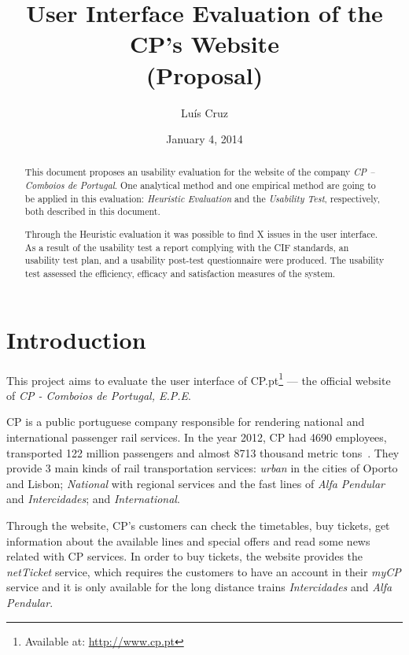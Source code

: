 \documentclass[a4paper]{article}
\title{User Interface Evaluation of the CP's Website\\ (Proposal)}
\author[1]{Luís  Cruz}
\affil[1]{MAP-i\\ Joint Doctoral Programme in Computer Science}
\date{January 4, 2014}
\begin{document}
\maketitle

\begin{abstract}
This document proposes an usability evaluation for the website of the company \emph{CP -- Comboios de Portugal}.
One analytical method and one empirical method are going to be applied in this evaluation: \emph{Heuristic Evaluation} and the \emph{Usability Test}, respectively, both described in this document.
  
Through the Heuristic evaluation it was possible to find X issues in the user interface.
As a result of the usability test a report complying with the CIF standards, an usability test plan, and a usability post-test questionnaire were produced. The usability test assessed the efficiency, efficacy and satisfaction measures of the system.

\end{abstract}

\section{Introduction}

This project aims to evaluate the user interface of CP.pt\footnote{Available at: \url{http://www.cp.pt}} --- the official website of \emph{CP - Comboios de Portugal, E.P.E}.

CP is a public portuguese company responsible for rendering national and international passenger rail services. In the year 2012, CP had 4690 employees, transported 122 million passengers and almost 8713 thousand metric tons~\citep{CP2012aa}. They provide 3 main kinds of rail transportation services: \emph{urban} in the cities of Oporto and Lisbon; \emph{National} with regional services and the fast lines of \emph{Alfa Pendular} and \emph{Intercidades}; and \emph{International}.

Through the website, CP's customers can check the timetables, buy tickets, get information about the available lines and special offers and read some news related with CP services. In order to buy tickets, the website provides the \emph{netTicket} service, which requires the customers to have an account in their \emph{myCP} service and it is only available for the long distance trains \emph{Intercidades} and \emph{Alfa Pendular}.
\end{document}
